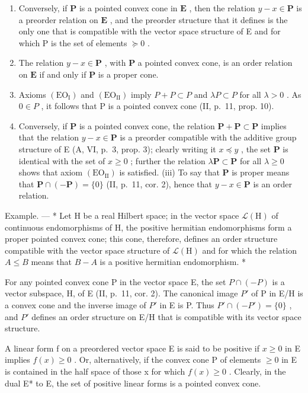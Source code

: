 \begin{enumerate}
\def\labelenumi{(\roman{enumi})}
\setcounter{enumi}{1}
\item
  Conversely, if \(\mathbf{P}\) is a pointed convex cone in \(\mathbf{E}\) , then the relation \(y - x \in \mathbf{P}\) is a preorder relation on \(\mathbf{E}\) , and the preorder structure that it defines is the only one that is compatible with the vector space structure of E and for which P is the set of elements \(\succcurlyeq 0\) .
\item
  The relation \(y - x \in \mathbf{P}\) , with \(\mathbf{P}\) a pointed convex cone, is an order relation on \(\mathbf{E}\) if and only if \(\mathbf{P}\) is a proper cone.
\item
  Axioms \((\mathrm{EO}_{\mathrm{I}})\) and \((\mathrm{EO}_{\mathrm{II}})\) imply \(P + P \subset P\) and \(\lambda P \subset P\) for all \(\lambda > 0\) . As \(0 \in P\) , it follows that P is a pointed convex cone (II, p.~11, prop. 10).
\item
  Conversely, if \(\mathbf{P}\) is a pointed convex cone, the relation \(\mathbf{P} + \mathbf{P} \subset \mathbf{P}\) implies that the relation \(y - x \in \mathbf{P}\) is a preorder compatible with the additive group structure of E (A, VI, p.~3, prop. 3); clearly writing it \(x \preccurlyeq y\) , the set \(\mathbf{P}\) is identical with the set of \(x \geqslant 0\) ; further the relation \(\lambda \mathbf{P} \subset \mathbf{P}\) for all \(\lambda \geqslant 0\) shows that axiom \((\mathrm{EO}_{\mathrm{II}})\) is satisfied. (iii) To say that \(\mathbf{P}\) is proper means that \(\mathbf{P} \cap (-\mathbf{P}) = \{0\}\) (II, p.~11, cor. 2), hence that \(y - x \in \mathbf{P}\) is an order relation.
\end{enumerate}

Example. --- * Let H be a real Hilbert space; in the vector space \(\mathcal{L}(\mathrm{H})\) of continuous endomorphisms of H, the positive hermitian endomorphisms form a proper pointed convex cone; this cone, therefore, defines an order structure compatible with the vector space structure of \(\mathcal{L}(\mathrm{H})\) and for which the relation \(A \leqslant B\) means that \(B - A\) is a positive hermitian endomorphism. *

For any pointed convex cone P in the vector space E, the set \(P \cap (-P)\) is a vector subspace, H, of E (II, p.~11, cor. 2). The canonical image \(P'\) of P in E/H is a convex cone and the inverse image of \(P'\) in E is P. Thus \(P' \cap (-P') = \{0\}\) , and \(P'\) defines an order structure on E/H that is compatible with its vector space structure.

A linear form f on a preordered vector space E is said to be positive if \(x \geqslant 0\) in E implies \(f(x) \geqslant 0\) . Or, alternatively, if the convex cone P of elements \(\geqslant 0\) in E is contained in the half space of those x for which \(f(x) \geqslant 0\) . Clearly, in the dual E* to E, the set of positive linear forms is a pointed convex cone.

